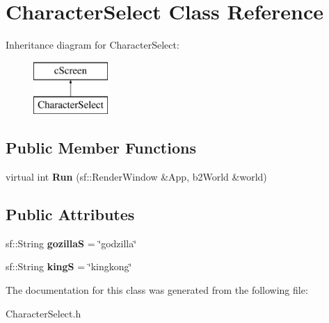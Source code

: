 \hypertarget{class_character_select}{}\section{Character\+Select Class Reference}
\label{class_character_select}
Inheritance diagram for Character\+Select\+:\begin{figure}[H]
\begin{center}
\leavevmode
\includegraphics[height=2.000000cm]{class_character_select}
\end{center}
\end{figure}
\subsection*{Public Member Functions}
\begin{DoxyCompactItemize}
\item 
virtual int {\bfseries Run} (sf\+::\+Render\+Window \&App, b2\+World \&world)\hypertarget{class_character_select_a4022284867082ce999b6d21a9ac85558}{}\label{class_character_select_a4022284867082ce999b6d21a9ac85558}

\end{DoxyCompactItemize}
\subsection*{Public Attributes}
\begin{DoxyCompactItemize}
\item 
sf\+::\+String {\bfseries gozillaS} = \char`\"{}godzilla\char`\"{}\hypertarget{class_character_select_a6b9dd41ea13ed1308ccd775682f88303}{}\label{class_character_select_a6b9dd41ea13ed1308ccd775682f88303}

\item 
sf\+::\+String {\bfseries kingS} = \char`\"{}kingkong\char`\"{}\hypertarget{class_character_select_a411ee518e81f1c863f73482d249b9fdf}{}\label{class_character_select_a411ee518e81f1c863f73482d249b9fdf}

\end{DoxyCompactItemize}


The documentation for this class was generated from the following file\+:\begin{DoxyCompactItemize}
\item 
Character\+Select.\+h\end{DoxyCompactItemize}
